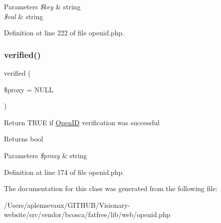 \begin{DoxyParams}{Parameters}
{\em \$key} & string \\
\hline
{\em \$val} & string \\
\hline
\end{DoxyParams}


Definition at line 222 of file openid.\+php.

\hypertarget{class_web_1_1_open_i_d_a5d29540442d0e302ca0916620ad2bc17}{}\label{class_web_1_1_open_i_d_a5d29540442d0e302ca0916620ad2bc17} 
\subsubsection{\texorpdfstring{verified()}{verified()}}
{\footnotesize\ttfamily verified (\begin{DoxyParamCaption}\item[{}]{\$proxy = {\ttfamily NULL} }\end{DoxyParamCaption})}

Return T\+R\+UE if \hyperlink{class_web_1_1_open_i_d}{Open\+ID} verification was successful \begin{DoxyReturn}{Returns}
bool 
\end{DoxyReturn}

\begin{DoxyParams}{Parameters}
{\em \$proxy} & string \\
\hline
\end{DoxyParams}


Definition at line 174 of file openid.\+php.



The documentation for this class was generated from the following file\+:\begin{DoxyCompactItemize}
\item 
/\+Users/aplennevaux/\+G\+I\+T\+H\+U\+B/\+Visionary-\/website/src/vendor/bcosca/fatfree/lib/web/openid.\+php\end{DoxyCompactItemize}
